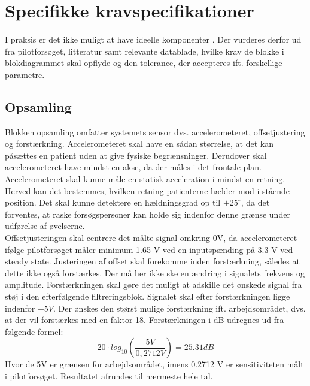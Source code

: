 \section{Specifikke kravspecifikationer}
I praksis er det ikke muligt at have ideelle komponenter \cite{Nilsson2011}. Der vurderes derfor ud fra pilotforsøget, litteratur samt relevante datablade, hvilke krav de blokke i blokdiagrammet skal opflyde og den tolerance, der accepteres ift. forskellige parametre.

\subsection{Opsamling}
Blokken opsamling omfatter systemets sensor dvs. accelerometeret, offsetjustering og forstærkning. Accelerometeret skal have en sådan størrelse, at det kan påsættes en patient uden at give fysiske begrænsninger. Derudover skal accelerometeret have mindst en akse, da der måles i det frontale plan. %
Accelerometeret skal kunne måle en statisk acceleration i mindst en retning. Herved kan det bestemmes, hvilken retning patienterne hælder mod i stående position.  %
Det skal kunne detektere en hældningsgrad op til $\pm 25^{\circ}$, da det forventes, at raske forsøgspersoner kan holde sig indenfor denne grænse under udførelse af øvelserne. \\
Offsetjusteringen skal centrere det målte signal omkring 0V, da accelerometeret ifølge pilotforsøget måler minimum 1.65 V ved en inputspænding på 3.3 V ved steady state. Justeringen af offset skal forekomme inden forstærkning, således at dette ikke også forstærkes. Der må her ikke ske en ændring i signalets frekvens og amplitude. 
Forstærkningen skal gøre det muligt at adskille det ønskede signal fra støj i den efterfølgende filtreringsblok. Signalet skal efter forstærkningen ligge indenfor $\pm 5 V$. Der ønskes den størst mulige forstærkning ift. arbejdsområdet, dvs. at der vil forstærkes med en faktor 18. Forstærkningen i dB udregnes ud fra følgende formel: 
\begin{equation}
20 \cdot log_{10} (\frac{5 V}{0,2712 V}) = 25.31 dB
\end{equation}
Hvor de 5V er grænsen for arbejdsområdet, imens 0.2712 V er sensitiviteten målt i pilotforsøget. Resultatet afrundes til nærmeste hele tal. 

